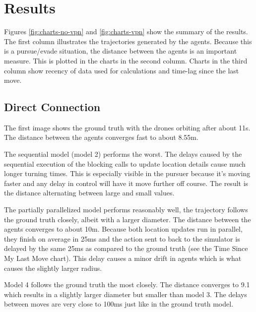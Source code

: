 \documentclass{article}
\begin{document}

\section{Results}
Figures \ref{fig:charts-no-vpn} and \ref{fig:charts-vpn} show the summary of the results.  The first column illustrates the trajectories generated by the agents. Because this is a pursue/evade situation, the distance between the agents is an important measure. This is plotted in the charts in the second column.
Charts in the third column show recency of data used for calculations and time-lag since the last move.

\subsection{Direct Connection}
The first image shows the ground truth with the drones orbiting after about 11s. The distance between the agents converges fast to about 8.55m.

The sequential model (model 2) performs the worst. The delays caused by the sequential execution of the blocking calls to update location details cause much longer turning times. This is especially visible in the pursuer because it's moving faster and any delay in control will have it move further off course. The result is the distance alternating between large and small values.

The partially parallelized model performs reasonably well, the trajectory follows the ground truth closely, albeit with a larger diameter. The distance between the agents converges to about 10m. Because both location updates run in parallel, they finish on average in 25ms and the action sent to back to the simulator is delayed by the same 25ms as compared to the ground truth (see the Time Since My Last Move chart). This delay causes a minor drift in agents which is what causes the slightly larger radius.

Model 4 follows the ground truth the most closely. The distance converges to 9.1 which results in a slightly larger diameter but smaller than model 3. The delays between moves are very close to 100ms just like in the ground truth model.
\end{document}
